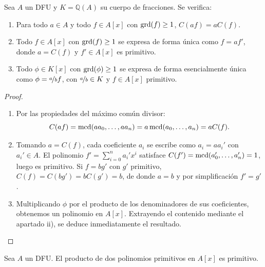 \begin{lema}\label{lemaPropsContenido}
    Sea $A$ un DFU y $K = \mathbb{Q}(A)$ su cuerpo de fracciones. Se verifica:
    \begin{enumerate}[label=\roman*)]
        \item Para todo $a \in A$ y todo $f \in A[x]$ con $\operatorname{grd}(f) \geq 1$, $C(af) = a C(f)$.
        \item Todo $f \in A[x]$ con $\operatorname{grd}(f) \geq 1$ se expresa de forma única como $f = af'$, donde $a = C(f)$ y $f' \in A[x]$ es primitivo.
        \item Todo $\phi \in K[x]$ con $\operatorname{grd}(\phi) \geq 1$ se expresa de forma esencialmente única como $\phi = \nicefrac{a}{b} f$, con $\nicefrac{a}{b} \in K$ y $f \in A[x]$ primitivo.
    \end{enumerate}
\end{lema}

\begin{proof}
    \leavevmode
    \begin{enumerate}[label=\roman*)]
        \item Por las propiedades del máximo común divisor:
        \[
            C(af) = \operatorname{mcd}(a a_0, \dots, a a_n) = a \operatorname{mcd}(a_0, \dots, a_n) = a C(f).
        \]

        \item Tomando $a = C(f)$, cada coeficiente $a_i$ se escribe como $a_i = a a_i'$ con $a_i' \in A$. El polinomio $f' = \sum\limits_{i=0}^n a_i' x^i$ satisface $C(f') = \operatorname{mcd}(a_0', \dots, a_n') = 1$, luego es primitivo. Si $f = b g'$ con $g'$ primitivo, $C(f) = C(b g') = b C(g') = b$, de donde $a = b$ y por simplificación $f' = g'$.

        \item Multiplicando $\phi$ por el producto de los denominadores de sus coeficientes, obtenemos un polinomio en $A[x]$. Extrayendo el contenido mediante el apartado ii), se deduce inmediatamente el resultado. \qedhere
    \end{enumerate}
\end{proof}

\begin{lema}[de Gauss]\label{lemaGauss}
    Sea $A$ un DFU.
    El producto de dos polinomios primitivos en $A[x]$ es primitivo.
\end{lema}

